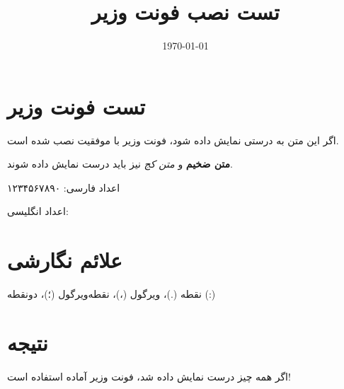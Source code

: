\documentclass[12pt,a4paper]{article}
\title{تست نصب فونت وزیر}
\date{\today}
\begin{document}
\maketitle

\section{تست فونت وزیر}

اگر این متن به درستی نمایش داده شود، فونت وزیر با موفقیت نصب شده است.

\textbf{متن ضخیم} و \textit{متن کج} نیز باید درست نمایش داده شوند.

اعداد فارسی: ۱۲۳۴۵۶۷۸۹۰

اعداد انگلیسی: 

\section{علائم نگارشی}
نقطه (.)، ویرگول (،)، نقطه‌ویرگول (؛)، دونقطه (:)

\section{نتیجه}
اگر همه چیز درست نمایش داده شد، فونت وزیر آماده استفاده است!
\end{document}
